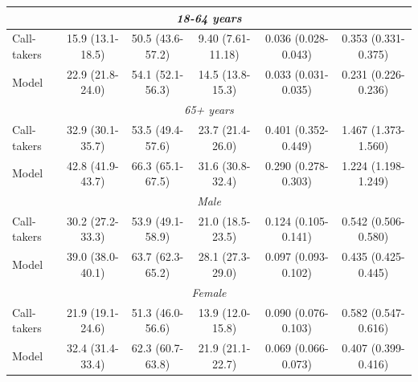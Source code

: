 \begin{frame}
\begin{table}[t]
{\begin{tabular}{l|ccccc}
            \midrule
            \multicolumn{6}{c}{\emph{18-64 years}} \\
            \midrule
            Call-takers                                 & 15.9 (13.1-18.5) & 50.5 (43.6-57.2) & 9.40 (7.61-11.18) & 0.036 (0.028-0.043) & 0.353 (0.331-0.375) \\
            Model                                       & 22.9 (21.8-24.0) & 54.1 (52.1-56.3) & 14.5 (13.8-15.3) & 0.033 (0.031-0.035) & 0.231 (0.226-0.236) \\ 
    
            \midrule
            \multicolumn{6}{c}{\emph{65+ years}} \\
            \midrule
            Call-takers                                 & 32.9 (30.1-35.7) & 53.5 (49.4-57.6) & 23.7 (21.4-26.0) & 0.401 (0.352-0.449) & 1.467 (1.373-1.560) \\
            Model                                       & 42.8 (41.9-43.7) & 66.3 (65.1-67.5) & 31.6 (30.8-32.4) & 0.290 (0.278-0.303) & 1.224 (1.198-1.249) \\
    
            \midrule
            \multicolumn{6}{c}{\emph{Male}} \\
            \midrule
            Call-takers                                 & 30.2 (27.2-33.3) & 53.9 (49.1-58.9) & 21.0 (18.5-23.5) & 0.124 (0.105-0.141) & 0.542 (0.506-0.580) \\
            Model                                       & 39.0 (38.0-40.1) & 63.7 (62.3-65.2) & 28.1 (27.3-29.0) & 0.097 (0.093-0.102) & 0.435 (0.425-0.445) \\
    
            \midrule
            \multicolumn{6}{c}{\emph{Female}} \\
            \midrule
            Call-takers                                 & 21.9 (19.1-24.6) & 51.3 (46.0-56.6) & 13.9 (12.0-15.8) & 0.090 (0.076-0.103) & 0.582 (0.547-0.616) \\
            Model                                       & 32.4 (31.4-33.4) & 62.3 (60.7-63.8) & 21.9 (21.1-22.7) & 0.069 (0.066-0.073) & 0.407 (0.399-0.416) \\
            
            \bottomrule
        \end{tabular}%
        }
    \end{table}
\end{frame}


